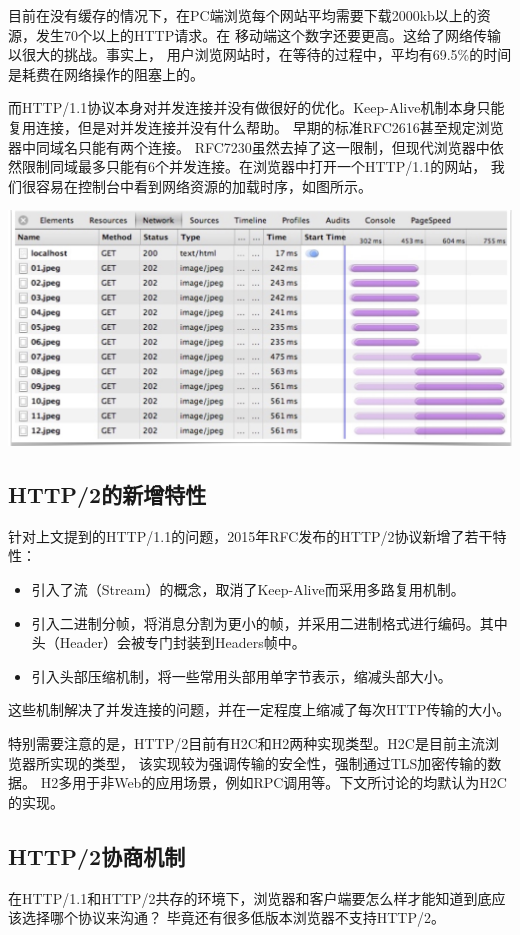 \documentclass[twoside]{CUGThesis}
\begin{document}
	目前在没有缓存的情况下，在PC端浏览每个网站平均需要下载2000kb以上的资源，发生70个以上的HTTP请求。在
	移动端这个数字还要更高。这给了网络传输以很大的挑战。事实上，
	用户浏览网站时，在等待的过程中，平均有69.5\%的时间是耗费在网络操作的阻塞上的。\par 
	而HTTP/1.1协议本身对并发连接并没有做很好的优化。Keep-Alive机制本身只能复用连接，但是对并发连接并没有什么帮助。
	早期的标准RFC2616甚至规定浏览器中同域名只能有两个连接。
	RFC7230虽然去掉了这一限制，但现代浏览器中依然限制同域最多只能有6个并发连接。在浏览器中打开一个HTTP/1.1的网站，
	我们很容易在控制台中看到网络资源的加载时序，如图所示。\\ \par 
	\includegraphics[scale=0.2]{Figures/web_load.jpg}
	\subsection{HTTP/2的新增特性}
	针对上文提到的HTTP/1.1的问题，2015年RFC发布的HTTP/2协议新增了若干特性：
	\begin{itemize}
		\item 引入了流（Stream）的概念，取消了Keep-Alive而采用多路复用机制。
		\item 引入二进制分帧，将消息分割为更小的帧，并采用二进制格式进行编码。其中头（Header）会被专门封装到Headers帧中。
		\item 引入头部压缩机制，将一些常用头部用单字节表示，缩减头部大小。
	\end{itemize} \par
	这些机制解决了并发连接的问题，并在一定程度上缩减了每次HTTP传输的大小。\par 
	特别需要注意的是，HTTP/2目前有H2C和H2两种实现类型。H2C是目前主流浏览器所实现的类型，
	该实现较为强调传输的安全性，强制通过TLS加密传输的数据。
	H2多用于非Web的应用场景，例如RPC调用等。下文所讨论的均默认为H2C的实现。
	\subsection{HTTP/2协商机制}
	在HTTP/1.1和HTTP/2共存的环境下，浏览器和客户端要怎么样才能知道到底应该选择哪个协议来沟通？
	毕竟还有很多低版本浏览器不支持HTTP/2。
\end{document}
